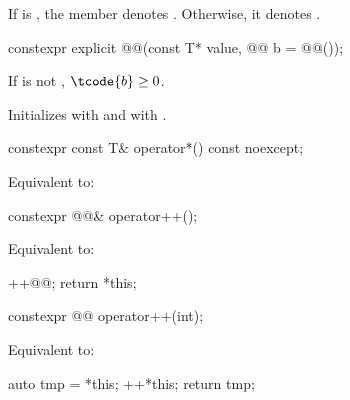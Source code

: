 \pnum
If  is ,
the member  
denotes .
Otherwise, it denotes .

%
\begin{itemdecl}
constexpr explicit @@(const T* value, @@ b = @@());
\end{itemdecl}

\begin{itemdescr}
\pnum
\expects
If  is not , $\tcode{b} \ge 0$.

\pnum
\effects
Initializes  with  and
 with .
\end{itemdescr}

%
\begin{itemdecl}
constexpr const T& operator*() const noexcept;
\end{itemdecl}

\begin{itemdescr}
\pnum
\effects
Equivalent to: 
\end{itemdescr}

%
\begin{itemdecl}
constexpr @@& operator++();
\end{itemdecl}

\begin{itemdescr}
\pnum
\effects
Equivalent to:
\begin{codeblock}
++@@;
return *this;
\end{codeblock}
\end{itemdescr}

%
\begin{itemdecl}
constexpr @@ operator++(int);
\end{itemdecl}

\begin{itemdescr}
\pnum
\effects
Equivalent to:
\begin{codeblock}
auto tmp = *this;
++*this;
return tmp;
\end{codeblock}
\end{itemdescr}


